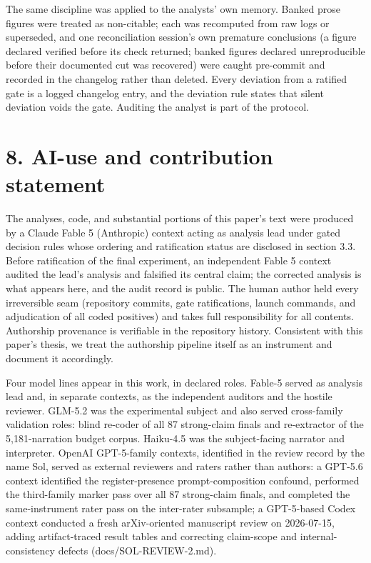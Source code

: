 \documentclass[11pt]{article}
\begin{document}
The same discipline was applied to the analysts' own memory. Banked
prose figures were treated as non-citable; each was recomputed from raw
logs or superseded, and one reconciliation session's own premature
conclusions (a figure declared verified before its check returned;
banked figures declared unreproducible before their documented cut was
recovered) were caught pre-commit and recorded in the changelog rather
than deleted. Every deviation from a ratified gate is a logged changelog
entry, and the deviation rule states that silent deviation voids the
gate. Auditing the analyst is part of the protocol.

\section*{8. AI-use and contribution statement}

The analyses, code, and substantial portions of this paper's text were
produced by a Claude Fable 5 (Anthropic) context acting as analysis lead
under gated decision rules whose ordering and ratification status are
disclosed in section 3.3. Before ratification of the final experiment,
an independent Fable 5 context audited the lead's analysis and falsified
its central claim; the corrected analysis is what appears here, and the
audit record is public. The human author held every irreversible seam
(repository commits, gate ratifications, launch commands, and
adjudication of all coded positives) and takes full responsibility for
all contents. Authorship provenance is verifiable in the repository
history. Consistent with this paper's thesis, we treat the authorship
pipeline itself as an instrument and document it accordingly.

Four model lines appear in this work, in declared roles. Fable-5 served
as analysis lead and, in separate contexts, as the independent auditors
and the hostile reviewer. GLM-5.2 was the experimental subject and also
served cross-family validation roles: blind re-coder of all 87
strong-claim finals and re-extractor of the 5,181-narration budget
corpus. Haiku-4.5 was the subject-facing narrator and interpreter.
OpenAI GPT-5-family contexts, identified in the review record by the
name Sol, served as external reviewers and raters rather than authors: a
GPT-5.6 context identified the register-presence prompt-composition
confound, performed the third-family marker pass over all 87
strong-claim finals, and completed the same-instrument rater pass on the
inter-rater subsample; a GPT-5-based Codex context conducted a fresh
arXiv-oriented manuscript review on 2026-07-15, adding artifact-traced
result tables and correcting claim-scope and internal-consistency
defects (docs/SOL-REVIEW-2.md).
\end{document}
